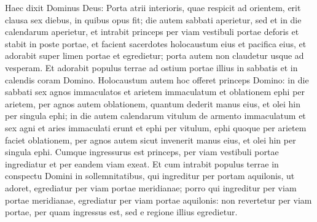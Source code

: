 \begin{biblechapter}
\begin{biblechapter}
\begin{biblechapter}
\begin{biblechapter}
\begin{biblechapter}
\begin{biblechapter}
\begin{biblechapter}
\begin{biblechapter}
\begin{biblechapter}
\begin{biblechapter}
\begin{biblechapter}
\begin{biblechapter}
\begin{biblechapter}
\begin{biblechapter}
\begin{biblechapter}
\begin{biblechapter}
\begin{biblechapter}
\begin{biblechapter}
\begin{biblechapter}
\begin{biblechapter}
\begin{biblechapter}
\begin{biblechapter}
\begin{biblechapter}
\begin{biblechapter}
\begin{biblechapter}
\begin{biblechapter}
\begin{biblechapter}
\begin{biblechapter}
\begin{biblechapter}
\begin{biblechapter}
\begin{biblechapter}
\begin{biblechapter}
\begin{biblechapter}
\begin{biblechapter}
\begin{biblechapter}
\begin{biblechapter}
\begin{biblechapter}
\begin{biblechapter}
\begin{biblechapter}
\begin{biblechapter}
\begin{biblechapter}
\begin{biblechapter}
\begin{biblechapter}
\begin{biblechapter}
\begin{biblechapter}
\begin{biblechapter}
\verse Haec dixit Dominus Deus: Porta atrii interioris, quae respicit ad orientem, erit clausa sex diebus, in quibus opus fit; die autem sabbati aperietur, sed et in die calendarum aperietur, 
\verse et intrabit princeps per viam vestibuli portae deforis et stabit in poste portae, et facient sacerdotes holocaustum eius et pacifica eius, et adorabit super limen portae et egredietur; porta autem non claudetur usque ad vesperam. 
\verse Et adorabit populus terrae ad ostium portae illius in sabbatis et in calendis coram Domino. 
\verse Holocaustum autem hoc offeret princeps Domino: in die sabbati sex agnos immaculatos et arietem immaculatum 
\verse et oblationem ephi per arietem, per agnos autem oblationem, quantum dederit manus eius, et olei hin per singula ephi; 
\verse in die autem calendarum vitulum de armento immaculatum et sex agni et aries immaculati erunt 
\verse et ephi per vitulum, ephi quoque per arietem faciet oblationem, per agnos autem sicut invenerit manus eius, et olei hin per singula ephi.
 \verse Cumque ingressurus est princeps, per viam vestibuli portae ingrediatur et per eandem viam exeat. 
\verse Et cum intrabit populus terrae in conspectu Domini in sollemnitatibus, qui ingreditur per portam aquilonis, ut adoret, egrediatur per viam portae meridianae; porro qui ingreditur per viam portae meridianae, egrediatur per viam portae aquilonis: non revertetur per viam portae, per quam ingressus est, sed e regione illius egredietur. 

\end{biblechapter}
\end{biblechapter}
\end{biblechapter}
\end{biblechapter}
\end{biblechapter}
\end{biblechapter}
\end{biblechapter}
\end{biblechapter}
\end{biblechapter}
\end{biblechapter}
\end{biblechapter}
\end{biblechapter}
\end{biblechapter}
\end{biblechapter}
\end{biblechapter}
\end{biblechapter}
\end{biblechapter}
\end{biblechapter}
\end{biblechapter}
\end{biblechapter}
\end{biblechapter}
\end{biblechapter}
\end{biblechapter}
\end{biblechapter}
\end{biblechapter}
\end{biblechapter}
\end{biblechapter}
\end{biblechapter}
\end{biblechapter}
\end{biblechapter}
\end{biblechapter}
\end{biblechapter}
\end{biblechapter}
\end{biblechapter}
\end{biblechapter}
\end{biblechapter}
\end{biblechapter}
\end{biblechapter}
\end{biblechapter}
\end{biblechapter}
\end{biblechapter}
\end{biblechapter}
\end{biblechapter}
\end{biblechapter}
\end{biblechapter}
\end{biblechapter}
